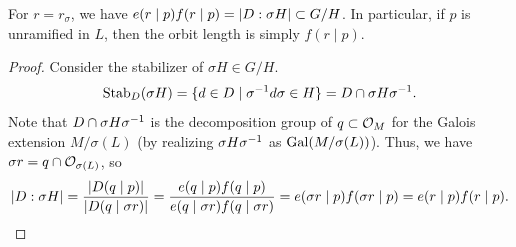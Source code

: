\begin{proposition} \label{prop:D_orbit_length}
    For $r = r_\sigma$, we have $e(r \mid p) f(r \mid p) = \left\lvert D : \sigma H \right\rvert \subset G/H$. In particular, if $p$ is unramified in $L$, then the orbit length is simply $f(r \mid p)$.
\end{proposition}
\begin{proof}
    Consider the stabilizer of $\sigma H \in G/H$.
    \[ \operatorname{Stab}_D(\sigma H) = \{d \in D \mid \sigma^{-1} d \sigma \in H\} = D \cap \sigma H \sigma^{-1}. \]
    Note that $D \cap \sigma H \sigma^{-1}$ is the decomposition group of $q \subset \mathcal O_M$ for the Galois extension $M / \sigma(L)$ (by realizing $\sigma H \sigma^{-1}$ as $\operatorname{Gal}(M/\sigma(L))$). Thus, we have $\sigma r = q \cap \mathcal O_{\sigma(L)}$, so
    \[ \left\lvert D : \sigma H \right\rvert = \frac{\left\lvert D(q \mid p) \right\rvert}{\left\lvert D(q \mid \sigma r) \right\rvert} = \frac{e(q \mid p) f(q \mid p)}{e(q \mid \sigma r) f(q \mid \sigma r)} = e(\sigma r \mid p) f(\sigma r \mid p) = e(r \mid p) f(r \mid p). \qedhere \]
\end{proof}

